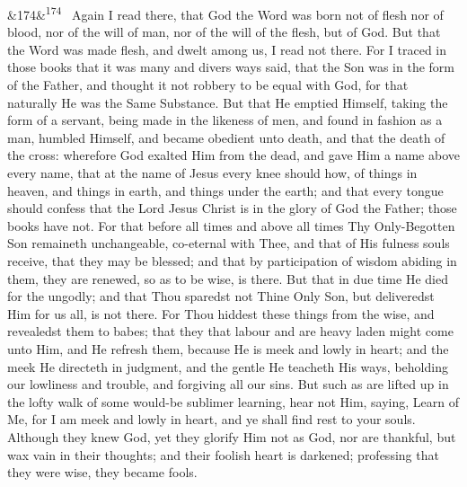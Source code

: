 \documentclass[12pt]{article}
\newcommand{\para}[1][]{\par\noindent\ifx&#1&\else\textsuperscript{\footnotesize #1}~\fi}
\begin{document}
\para[174] Again I read there, that God the Word was born not of flesh nor of blood, nor of the will of man, nor of the will of the flesh, but of God. But that the Word was made flesh, and dwelt among us, I read not there. For I traced in those books that it was many and divers ways said, that the Son was in the form of the Father, and thought it not robbery to be equal with God, for that naturally He was the Same Substance. But that He emptied Himself, taking the form of a servant, being made in the likeness of men, and found in fashion as a man, humbled Himself, and became obedient unto death, and that the death of the cross: wherefore God exalted Him from the dead, and gave Him a name above every name, that at the name of Jesus every knee should how, of things in heaven, and things in earth, and things under the earth; and that every tongue should confess that the Lord Jesus Christ is in the glory of God the Father; those books have not. For that before all times and above all times Thy Only-Begotten Son remaineth unchangeable, co-eternal with Thee, and that of His fulness souls receive, that they may be blessed; and that by participation of wisdom abiding in them, they are renewed, so as to be wise, is there. But that in due time He died for the ungodly; and that Thou sparedst not Thine Only Son, but deliveredst Him for us all, is not there. For Thou hiddest these things from the wise, and revealedst them to babes; that they that labour and are heavy laden might come unto Him, and He refresh them, because He is meek and lowly in heart; and the meek He directeth in judgment, and the gentle He teacheth His ways, beholding our lowliness and trouble, and forgiving all our sins. But such as are lifted up in the lofty walk of some would-be sublimer learning, hear not Him, saying, Learn of Me, for I am meek and lowly in heart, and ye shall find rest to your souls. Although they knew God, yet they glorify Him not as God, nor are thankful, but wax vain in their thoughts; and their foolish heart is darkened; professing that they were wise, they became fools.
\end{document}
